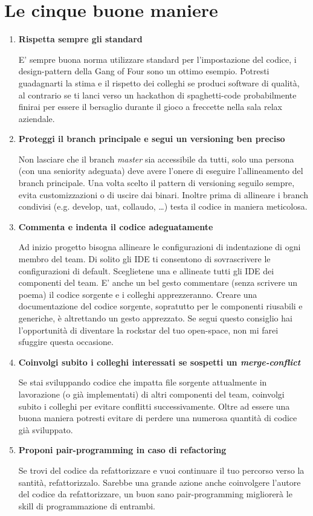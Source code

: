 \section{Le cinque buone maniere}

\begin{enumerate}

\item \textbf{Rispetta sempre gli standard}

E' sempre buona norma utilizzare standard per l'impostazione del codice, i design-pattern della Gang of Four sono un ottimo esempio. Potresti guadagnarti la stima e il rispetto dei colleghi se produci software di qualità, al contrario se ti lanci verso un hackathon di spaghetti-code probabilmente finirai per essere il bersaglio durante il gioco a freccette nella sala relax aziendale.

\item \textbf{Proteggi il branch principale e segui un versioning ben preciso}

Non lasciare che il branch \emph{master} sia accessibile da tutti, solo una persona (con una seniority adeguata) deve avere l'onere di eseguire l'allineamento del branch principale. Una volta scelto il pattern di versioning seguilo sempre, evita customizzazioni o di uscire dai binari. Inoltre prima di allineare i branch condivisi (e.g. develop, uat, collaudo, \dots) testa il codice in maniera meticolosa.


\item \textbf{Commenta e indenta il codice adeguatamente}

Ad inizio progetto bisogna allineare le configurazioni di indentazione di ogni membro del team. Di solito gli IDE ti consentono di sovrascrivere le configurazioni di default. Sceglietene una e allineate tutti gli IDE dei componenti del team. E' anche un bel gesto commentare (senza scrivere un poema) il codice sorgente e i colleghi apprezzeranno. Creare una documentazione del codice sorgente, sopratutto per le componenti riusabili e generiche, è altrettando un gesto apprezzato. Se segui questo consiglio hai l'opportunità di diventare la rockstar del tuo open-space, non mi farei sfuggire questa occasione.


\item \textbf{Coinvolgi subito i colleghi interessati se sospetti un \emph{merge-conflict}}

Se stai sviluppando codice che impatta file sorgente attualmente in lavorazione (o già implementati) di altri componenti del team, coinvolgi subito i colleghi per evitare conflitti successivamente. Oltre ad essere una buona maniera potresti evitare di perdere una numerosa quantità di codice già sviluppato.

\item \textbf{Proponi pair-programming in caso di refactoring}

Se trovi del codice da refattorizzare e vuoi continuare il tuo percorso verso la santità, refattorizzalo. Sarebbe una grande azione anche coinvolgere l'autore del codice da refattorizzare, un buon sano pair-programming migliorerà le skill di programmazione di entrambi.


\end{enumerate}